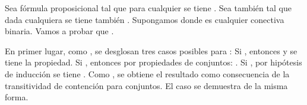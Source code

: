 \begin{isabellebody}
\begin{isamarkuptext}
\begin{demostracion}
    Sea  fórmula proposicional tal que para cualquier  
    se tiene . Sea también  tal que 
    dada  cualquiera se tiene también 
    . Supongamos  donde 
    \isa{{\isacharasterisk}} es cualquier conectiva binaria. Vamos a probar que 
    .

    En primer lugar, como 
    , se desglosan tres
    casos posibles para :
    Si , entonces  y se tiene la propiedad.
    Si , entonces por propiedades de 
    conjuntos:
    . Si , por hipótesis 
    de inducción se tiene . Como 
    , se obtiene el 
    resultado como consecuencia de la transitividad de contención para 
    conjuntos. El caso  se demuestra de la misma forma.      
  \end{demostracion}


\end{isamarkuptext}
\end{isabellebody}
